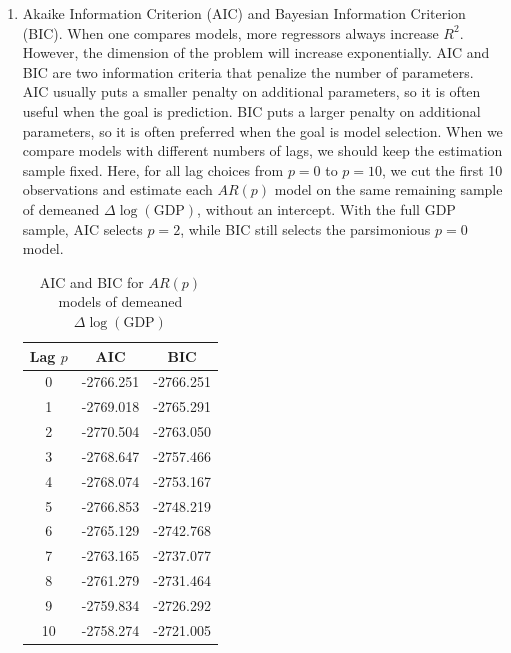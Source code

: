 \documentclass[12pt]{article}
\begin{document}
\begin{enumerate}
    \item Akaike Information Criterion (AIC) and Bayesian Information Criterion (BIC). When one compares models, more regressors always increase $R^2$. However, the dimension of the problem will increase exponentially. AIC and BIC are two information criteria that penalize the number of parameters. AIC usually puts a smaller penalty on additional parameters, so it is often useful when the goal is prediction. BIC puts a larger penalty on additional parameters, so it is often preferred when the goal is model selection. When we compare models with different numbers of lags, we should keep the estimation sample fixed. Here, for all lag choices from $p=0$ to $p=10$, we cut the first 10 observations and estimate each $AR(p)$ model on the same remaining sample of demeaned $\Delta \log(\text{GDP})$, without an intercept. With the full GDP sample, AIC selects $p=2$, while BIC still selects the parsimonious $p=0$ model.

    \begin{table}[H]
        \centering
        \caption{AIC and BIC for $AR(p)$ models of demeaned $\Delta \log(\text{GDP})$}
        \label{tab:rgdp-logdiff-aic-bic}
        \begin{tabular}{ccc}
            \toprule
            Lag $p$ & AIC & BIC \\
            \midrule
            0 & -2766.251 & -2766.251 \\
            1 & -2769.018 & -2765.291 \\
            2 & -2770.504 & -2763.050 \\
            3 & -2768.647 & -2757.466 \\
            4 & -2768.074 & -2753.167 \\
            5 & -2766.853 & -2748.219 \\
            6 & -2765.129 & -2742.768 \\
            7 & -2763.165 & -2737.077 \\
            8 & -2761.279 & -2731.464 \\
            9 & -2759.834 & -2726.292 \\
            10 & -2758.274 & -2721.005 \\
            \bottomrule
        \end{tabular}
    \end{table}


\end{enumerate}
\end{document}
